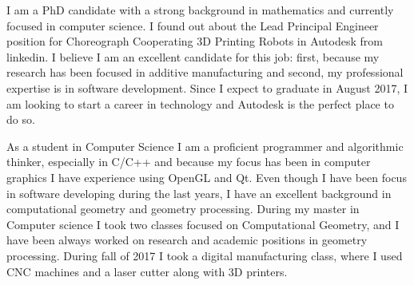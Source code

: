 \documentclass[10pt,stdletter,dateno,sigleft,letterpaper]{newlfm} %
\begin{document}
\begin{newlfm}



I am a PhD candidate with a strong background in mathematics and currently focused in computer science. I found out about the Lead Principal Engineer position for Choreograph Cooperating 3D Printing Robots in Autodesk from linkedin. I believe I am an excellent candidate for this job: first, because my research has been focused in additive manufacturing and second, my professional expertise is in software development. Since I expect to graduate in August 2017, I am looking to start a career in technology and Autodesk is the perfect place to do so.

As a student in Computer Science I am a proficient programmer and algorithmic thinker, especially in C/C++ and because my focus has been in computer graphics I have experience using OpenGL and Qt. Even though I have been focus in software developing during the last years, I have an excellent background in computational geometry and geometry processing. During my master in Computer science I took two classes focused on Computational Geometry, and I have been always worked on research and academic positions in geometry processing. During fall of 2017 I took a digital manufacturing class, where I used CNC machines and a laser cutter along with 3D printers.


\end{newlfm}
\end{document}
